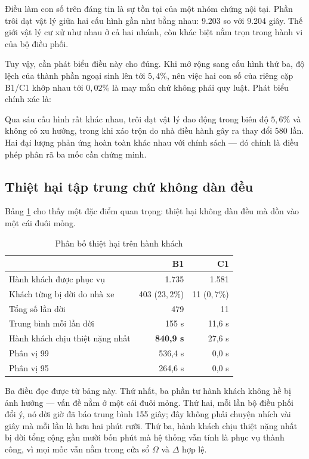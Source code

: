 Điều làm con số trên đáng tin là sự tồn tại của một nhóm chứng nội tại. Phần trôi dạt vật lý
giữa hai cấu hình gần như bằng nhau: 9.203 so với 9.204 giây. Thế giới vật lý cư xử như nhau ở
cả hai nhánh, còn khác biệt nằm trọn trong hành vi của bộ điều phối.

Tuy vậy, cần phát biểu điều này cho đúng. Khi mở rộng sang cấu hình thứ ba, độ lệch của thành
phần ngoại sinh lên tới $5{,}4\%$, nên việc hai con số của riêng cặp B1/C1 khớp nhau tới
$0{,}02\%$ là may mắn chứ không phải quy luật. Phát biểu chính xác là:

\begin{khungy}
Qua sáu cấu hình rất khác nhau, trôi dạt vật lý dao động trong biên độ $5{,}6\%$ và không có xu
hướng, trong khi xáo trộn do nhà điều hành gây ra thay đổi 580 lần. Hai đại lượng phản ứng hoàn
toàn khác nhau với chính sách --- đó chính là điều phép phân rã ba mốc cần chứng minh.
\end{khungy}

\subsection{Thiệt hại tập trung chứ không dàn đều}

Bảng \ref{bang:taptrung} cho thấy một đặc điểm quan trọng: thiệt hại không dàn đều mà dồn vào
một cái đuôi mỏng.

\begin{table}[htbp]
\centering
\caption{Phân bố thiệt hại trên hành khách}
\label{bang:taptrung}
\small
\begin{tabular}{@{}lrr@{}}
\toprule
& \textbf{B1} & \textbf{C1}\\
\midrule
Hành khách được phục vụ & 1.735 & 1.581\\
Khách từng bị dời do nhà xe & 403 ($23{,}2\%$) & 11 ($0{,}7\%$)\\
Tổng số lần dời & 479 & 11\\
Trung bình mỗi lần dời & 155 s & 11{,}6 s\\
Hành khách chịu thiệt nặng nhất & \textbf{840{,}9 s} & 27{,}6 s\\
Phân vị 99 & 536{,}4 s & 0{,}0 s\\
Phân vị 95 & 264{,}6 s & 0{,}0 s\\
\bottomrule
\end{tabular}
\end{table}

Ba điều đọc được từ bảng này. Thứ nhất, ba phần tư hành khách không hề bị ảnh hưởng --- vấn đề
nằm ở một cái đuôi mỏng. Thứ hai, mỗi lần bộ điều phối đổi ý, nó dời giờ đã báo trung bình 155
giây; đây không phải chuyện nhích vài giây mà mỗi lần là hơn hai phút rưỡi. Thứ ba, hành khách
chịu thiệt nặng nhất bị dời tổng cộng gần mười bốn phút mà hệ thống vẫn tính là phục vụ thành
công, vì mọi mốc vẫn nằm trong cửa sổ $\Omega$ và $\Delta$ hợp lệ.

